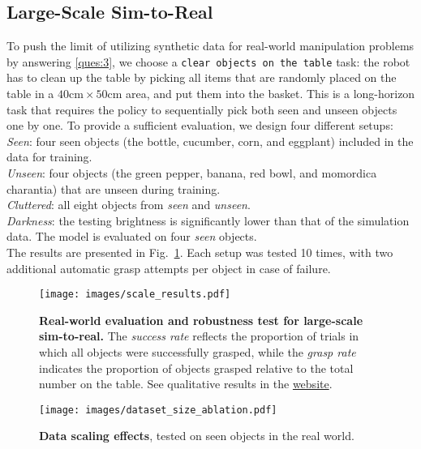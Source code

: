 \subsection{Large-Scale Sim-to-Real}
\label{sec:large-scale-experiment}
To push the limit of utilizing synthetic data for real-world manipulation problems by answering \ref{ques:3}, we choose a \texttt{clear objects on the table} task: the robot has to clean up the table by picking all items that are randomly placed on the table in a $40\text{cm} \times 50\text{cm}$ area, and put them into the basket. This is a long-horizon task that requires the policy to sequentially pick both seen and unseen objects one by one. To provide a sufficient evaluation, we design four different setups:\\
\noindent\textit{Seen}: four seen objects (the bottle, cucumber, corn, and eggplant) included in the data for training. \\
\noindent\textit{Unseen}: four objects (the green pepper, banana, red bowl, and momordica charantia) that are unseen during training. \\
\noindent\textit{Cluttered}: all eight objects from \textit{seen} and \textit{unseen}. \\
 \noindent\textit{Darkness}: the testing brightness is significantly lower than that of the simulation data. The model is evaluated on four \textit{seen} objects.\\
The results are presented in Fig.~\ref{fig:scale_results}. Each setup was tested 10 times, with two additional automatic grasp attempts per object in case of failure.

\begin{figure}[tb]
    \centering
    \texttt{[image: images/scale\_results.pdf]}
    \vspace{-8pt}
    \caption{\textbf{Real-world evaluation and robustness test for large-scale sim-to-real.} The \textit{success rate} reflects the proportion of trials in which all objects were successfully grasped, while the \textit{grasp rate} indicates the proportion of objects grasped relative to the total number on the table. See qualitative results in the \href{http://xshenhan.github.io/Re3Sim/}{ website}.}
    \label{fig:scale_results}
\end{figure}

\begin{figure}[tb]
    \centering
    \texttt{[image: images/dataset\_size\_ablation.pdf]}
    \caption{\textbf{Data scaling effects}, tested on seen objects in the real world. }
    \label{fig:dataset-size}
\end{figure}


